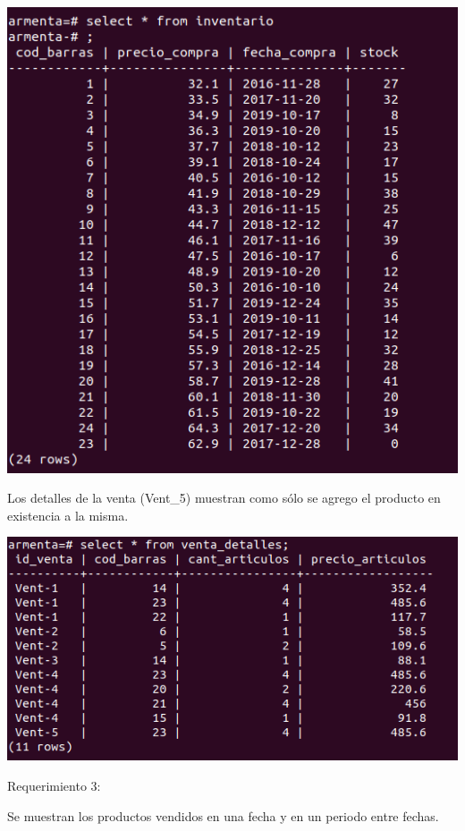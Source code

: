 \documentclass[12pt, letterpaper]{article}     %
\begin{document}
		\begin{center}
 	  	\includegraphics[scale=0.5]{inventario_stock_insuficiente}
		\end{center}
		
		Los detalles de la venta (Vent\_5) muestran como sólo se agrego el producto en existencia a la misma.
		
		\begin{center}
 	  	\includegraphics[scale=0.5]{venta_detalles_after_agregar}
		\end{center}
		\pagebreak
		Requerimiento 3:
		
		Se muestran los productos vendidos en una fecha y en un periodo entre fechas.
		
\end{document}
